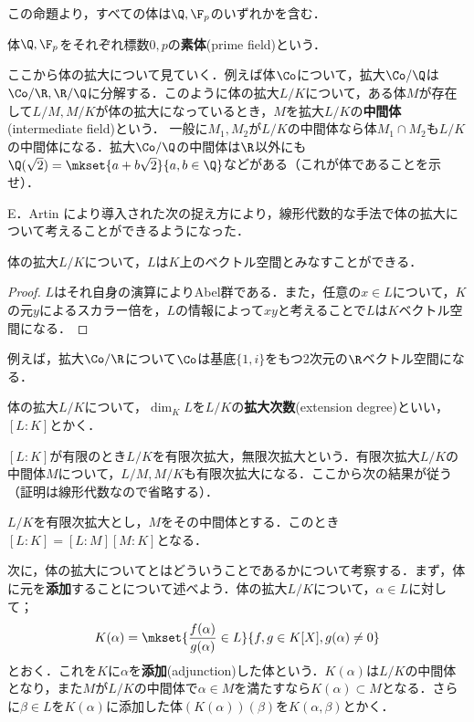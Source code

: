 この命題より，すべての体は$\Q,\F_p$のいずれかを含む．

\begin{defi}[素体]
	体$\Q,\F_p$をそれぞれ標数$0,p$の\textbf{素体}(prime field)という．
\end{defi}

ここから体の拡大について見ていく．例えば体$\Co$について，拡大$\Co/\Q$は$\Co/\R,\R/\Q$に分解する．このように体の拡大$L/K$について，ある体$M$が存在して$L/M,M/K$が体の拡大になっているとき，$M$を拡大$L/K$の\textbf{中間体}(intermediate field)という． 一般に$M_1,M_2$が$L/K$の中間体なら体$M_1\cap M_2$も$L/K$の中間体になる．拡大$\Co/\Q$の中間体は$\R$以外にも$\Q(\sqrt{2})=\mkset{a+b\sqrt{2}}{a,b\in\Q}$などがある（これが体であることを示せ）．

E．Artin により導入された次の捉え方により，線形代数的な手法で体の拡大について考えることができるようになった．

\begin{prop}
	体の拡大$L/K$について，$L$は$K$上のベクトル空間とみなすことができる．
\end{prop}

\begin{proof}
	$L$はそれ自身の演算によりAbel群である．また，任意の$x\in L$について，$K$の元$y$によるスカラー倍を，$L$の情報によって$xy$と考えることで$L$は$K$ベクトル空間になる．
\end{proof}

例えば，拡大$\Co/\R$について$\Co$は基底$\{1,i\}$をもつ$2$次元の$\R$ベクトル空間になる．

\begin{defi}[拡大次数]
	体の拡大$L/K$について，$\dim_K L$を$L/K$の\textbf{拡大次数}(extension degree)といい，$[L:K]$とかく．
\end{defi}

$[L:K]$が有限のとき$L/K$を有限次拡大，無限次拡大という．有限次拡大$L/K$の中間体$M$について，$L/M,M/K$も有限次拡大になる．ここから次の結果が従う（証明は線形代数なので省略する）．

\begin{prop}
	$L/K$を有限次拡大とし，$M$をその中間体とする．このとき$[L:K]=[L:M][M:K]$となる．
\end{prop}

次に，体の拡大についてとはどういうことであるかについて考察する．まず，体に元を\textbf{添加}することについて述べよう．体の拡大$L/K$について，$\alpha\in L$に対して；
\[K(\alpha)=\mkset{\frac{f(\alpha)}{g(\alpha)}\in L}{f,g\in K[X],g(\alpha)\neq0}\]
とおく．これを$K$に$\alpha$を\textbf{添加}(adjunction)した体という．$K(\alpha)$は$L/K$の中間体となり，また$M$が$L/K$の中間体で$\alpha\in M$を満たすなら$K(\alpha)\subset M$となる．さらに$\beta\in L$を$K(\alpha)$に添加した体$(K(\alpha))(\beta)$を$K(\alpha,\beta)$とかく．

